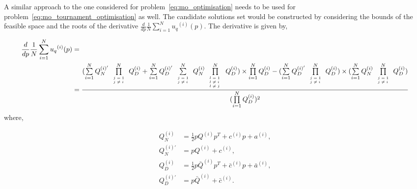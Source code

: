 \documentclass[10pt]{article}
\begin{document}
A similar approach to the one considered for problem~\ref{eq:mo_optimisation} needs
to be used for problem~\ref{eq:mo_tournament_optimisation} as well. The candidate
solutions set would be constructed by considering the bounds of the feasible space
and the roots of the derivative \(\frac{d}{dp} \frac{1}{N} \sum\limits_{i=1} ^ {N} {u_q}^{(i)} (p)\).
The derivative is given by,

{\scriptsize
\begin{align}\label{eq:mo_tournament_derivative}
    \frac{d}{dp} \frac{1}{N} \sum\limits_{i=1} ^ {N} {u_q}^{(i)} (p) & = \nonumber \\
    & =\frac{
    (\sum\limits_{i=1} ^ {N} Q_{N}^{(i)'} \prod\limits_{\tiny\begin{array}{l} j=1 \\ j \neq i \end{array}} ^ N Q_{D}^{(i)}
    + \sum\limits_{i=1} ^ {N} Q_{D}^{(i)'} \sum\limits_{\tiny\begin{array}{l} j=1 \\ j \neq i \end{array}} ^ {N} Q_{N}^{(i)}
    \prod\limits_{\tiny\begin{array}{l} l=1 \\ l \neq i \ \\ l \neq j \end{array}} ^ N Q_{D}^{(i)}) \times
    \prod\limits_{i=1} ^ N Q_{D}^{(i)} - (\sum\limits_{i=1} ^ {N} Q_{D}^{(i)'}
    \prod\limits_{\tiny\begin{array}{l} j=1 \\ j \neq i \end{array}} ^ N Q_{D}^{(i)}) \times 
    (\sum\limits_{i=1} ^ {N} Q_{N}^{(i)} \prod\limits_{\tiny\begin{array}{l} j=1 \\ j \neq i \end{array}} ^ N Q_{D}^{(i)})}
    {(\prod\limits_{i=1} ^ N Q_{D}^{(i)})^{2}}
\end{align}
}
where,

\begin{align*}
    Q_{N}^{(i) } & = \frac{1}{2} pQ^{(i)} p^T + c^{(i)} p + a^ {(i)}, \\
    Q_{N}^{(i)'} & =  pQ^{(i)} + c^{(i)}, \\
    Q_{D}^{(i) } & = \frac{1}{2} p\bar{Q}^{(i)} p^T + \bar{c}^{(i)} p + \bar{a}^ {(i)}, \\
    Q_{D}^{(i)'} & =  p\bar{Q}^{(i)} + \bar{c}^{(i)}. \\
\end{align*}
\end{document}
